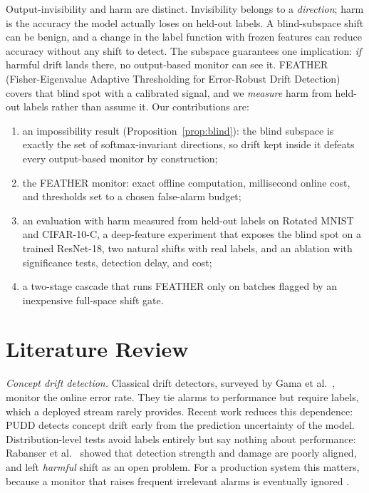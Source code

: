 \documentclass[conference]{IEEEtran}
\begin{document}
Output-invisibility and harm are distinct. Invisibility belongs to a
\emph{direction}; harm is the accuracy the model actually loses on held-out
labels. A blind-subspace shift can be benign, and a change in the label
function with frozen features can reduce accuracy without any shift to detect.
The subspace guarantees one implication: \emph{if} harmful drift lands there,
no output-based monitor can see it. FEATHER (Fisher-Eigenvalue Adaptive
Thresholding for Error-Robust Drift Detection) covers that blind spot with a
calibrated signal, and we \emph{measure} harm from held-out labels rather than
assume it. Our contributions are:
\begin{enumerate}
  \item an impossibility result (Proposition~\ref{prop:blind}): the blind
    subspace is exactly the set of softmax-invariant directions, so drift kept
    inside it defeats every output-based monitor by construction;
  \item the FEATHER monitor: exact offline computation, millisecond online
    cost, and thresholds set to a chosen false-alarm budget;
  \item an evaluation with harm measured from held-out labels on Rotated MNIST
    and CIFAR-10-C, a deep-feature experiment that exposes the blind spot on a
    trained ResNet-18, two natural shifts with real labels, and an ablation
    with significance tests, detection delay, and cost;
  \item a two-stage cascade that runs FEATHER only on batches flagged by an
    inexpensive full-space shift gate.
\end{enumerate}

\section{Literature Review}
\label{sec:related}

\textit{Concept drift detection.}
Classical drift detectors, surveyed by Gama et al.\ \cite{gama2014survey},
monitor the online error rate. They tie alarms to performance but require
labels, which a deployed stream rarely provides. Recent work reduces this
dependence: PUDD \cite{pudd2025} detects concept drift early from the
prediction uncertainty of the model. Distribution-level tests avoid labels
entirely but say nothing about performance: Rabanser et al.\
\cite{rabanser2019failing} showed that detection strength and damage are
poorly aligned, and left \emph{harmful} shift as an open problem. For a
production system this matters, because a monitor that raises frequent
irrelevant alarms is eventually ignored \cite{sculley2015debt}.
\end{document}
